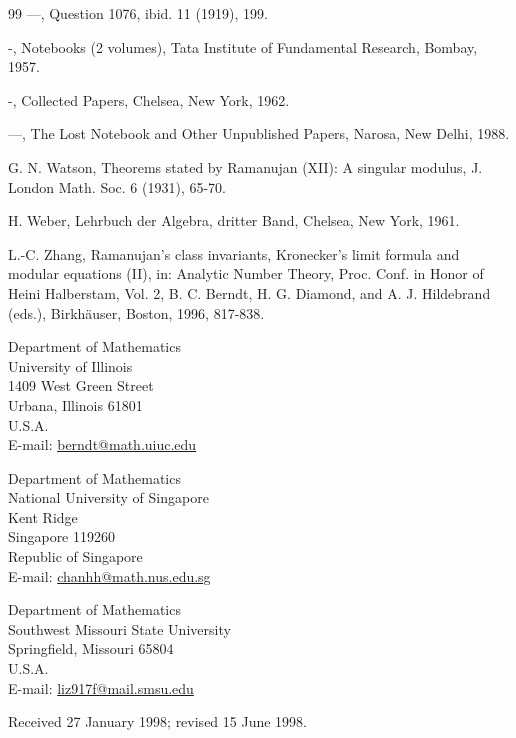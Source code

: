 \documentclass[11pt,letterpaper]{article}
\begin{document}
\begin{thebibliography}{99}
 —, Question 1076, ibid. 11 (1919), 199.

 -, Notebooks (2 volumes), Tata Institute of Fundamental Research, Bombay, 1957.

 -, Collected Papers, Chelsea, New York, 1962.

 —, The Lost Notebook and Other Unpublished Papers, Narosa, New Delhi, 1988.

 G. N. Watson, Theorems stated by Ramanujan (XII): A singular modulus, J. London Math. Soc. 6 (1931), 65-70.

 H. Weber, Lehrbuch der Algebra, dritter Band, Chelsea, New York, 1961.

 L.-C. Zhang, Ramanujan's class invariants, Kronecker's limit formula and modular equations (II), in: Analytic Number Theory, Proc. Conf. in Honor of Heini Halberstam, Vol. 2, B. C. Berndt, H. G. Diamond, and A. J. Hildebrand (eds.), Birkhäuser, Boston, 1996, 817-838.
\end{thebibliography}


Department of Mathematics\\
University of Illinois\\
1409 West Green Street\\
Urbana, Illinois 61801\\
U.S.A.\\
E-mail: \href{mailto:berndt@math.uiuc.edu}{berndt@math.uiuc.edu}

Department of Mathematics\\
National University of Singapore\\
Kent Ridge\\
Singapore 119260\\
Republic of Singapore\\
E-mail: \href{mailto:chanhh@math.nus.edu.sg}{chanhh@math.nus.edu.sg}

Department of Mathematics\\
Southwest Missouri State University\\
Springfield, Missouri 65804\\
U.S.A.\\
E-mail: \href{mailto:liz917f@mail.smsu.edu}{liz917f@mail.smsu.edu}

\begin{center}\small Received 27 January 1998; revised 15 June 1998.\end{center}
\end{document}
